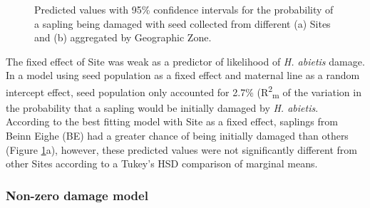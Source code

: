 \documentclass[a4paper, 11pt]{article}
\begin{document}
\begin{figure}[H]
\centering
	\caption{Predicted values with 95\% confidence intervals for the probability of a sapling being damaged with seed collected from different (a) Sites and (b) aggregated by Geographic Zone.}
	\label{pred_binom}
\end{figure}



The fixed effect of Site was weak as a predictor of likelihood of \textit{H. abietis} damage. In a model using seed population as a fixed effect and maternal line as a random intercept effect, seed population only accounted for 2.7\% (R\textsuperscript{2}\textsubscript{m} of the variation in the probability that a sapling would be initially damaged by \textit{H. abietis}. According to the best fitting model with Site as a fixed effect, saplings from Beinn Eighe (BE) had a greater chance of being initially damaged than others (Figure \ref{pred_binom}a), however, these predicted values were not significantly different from other Sites according to a Tukey's HSD comparison of marginal means.

\subsubsection*{Non-zero damage model}
\end{document}
